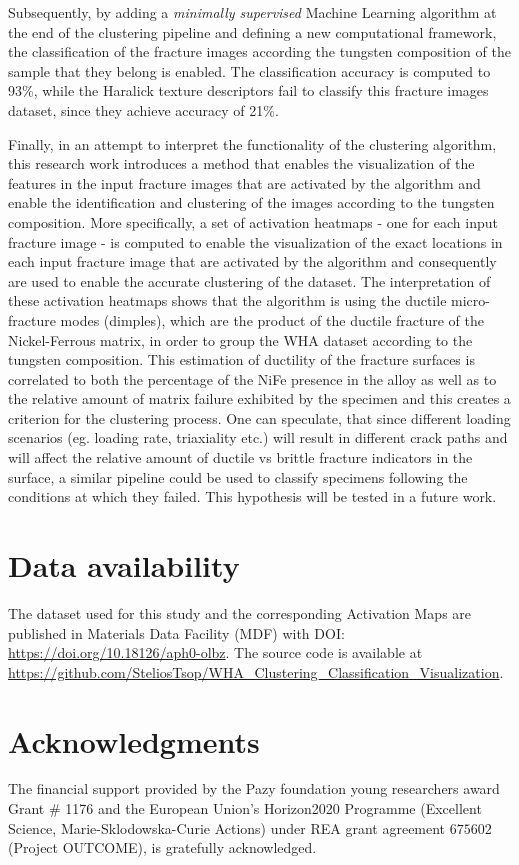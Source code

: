 \documentclass[authoryear,preprint,review,12pt, singleside]{elsarticle}
\begin{document}
Subsequently, by adding a \textit{minimally supervised} Machine Learning algorithm at the end of the clustering pipeline and defining a new computational framework, the classification of the fracture images according the tungsten composition of the sample that they belong is enabled. The classification accuracy is computed to 93\%, while the Haralick texture descriptors fail to classify this fracture images dataset, since they achieve accuracy of 21\%. 

Finally, in an attempt to interpret the functionality of the clustering algorithm, this research work introduces a method that enables the visualization of the features in the input fracture images that are activated by the algorithm and enable the identification and clustering of the images according to the tungsten composition. More specifically, a set of activation heatmaps - one for each input fracture image - is computed to enable the visualization of the exact locations in each input fracture image that are activated by the algorithm and consequently are used to enable the accurate clustering of the dataset. The interpretation of these activation heatmaps shows that the algorithm is using the ductile micro-fracture modes (dimples), which are the product of the ductile fracture of the Nickel-Ferrous matrix, in order to group the WHA dataset according to the tungsten composition. This estimation of ductility of the fracture surfaces is correlated to both the percentage of the NiFe presence in the alloy as well as to the relative amount of matrix failure exhibited by the specimen and this creates a criterion for the clustering process.  One can speculate, that since different loading scenarios (eg. loading rate, triaxiality etc.) will result in different crack paths and will affect the relative amount of ductile vs brittle fracture indicators in the surface, a similar pipeline could be used to classify specimens following the conditions at which they failed. This hypothesis will be tested in a future work.   


\section*{Data availability} The  dataset used for this study and the corresponding Activation Maps are published in Materials Data Facility (MDF) with DOI: \url{https://doi.org/10.18126/aph0-olbz}. The source code is available at \url{https://github.com/SteliosTsop/WHA_Clustering_Classification_Visualization}.  

\section*{Acknowledgments}
	The financial support provided by the Pazy foundation young researchers award Grant $\#$ 1176  and the European Union's Horizon2020 Programme (Excellent Science, Marie-Sklodowska-Curie Actions) under REA grant agreement $675602$ (Project OUTCOME), is gratefully acknowledged. 




\clearpage



\end{document}
